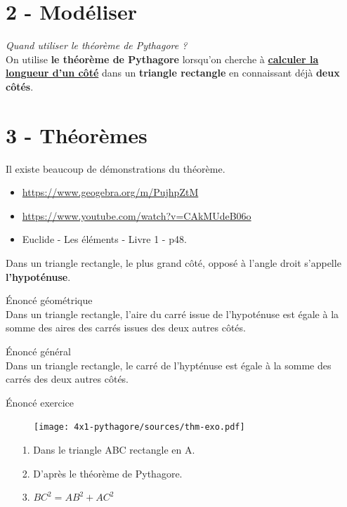 \documentclass[12pt]{article}
\begin{document}
\newpage
\section*{2 - Modéliser}

\textit{Quand utiliser le théorème de Pythagore ?}\\

On utilise \textbf{le théorème de Pythagore} lorsqu'on cherche à \underline{\textbf{calculer la longueur d'un côté}} dans un \textbf{triangle rectangle} en connaissant déjà \textbf{deux côtés}.



\section*{3 - Théorèmes}

Il existe beaucoup de démonstrations du théorème.

\begin{itemize}
	\item \url{https://www.geogebra.org/m/PujhpZtM}
	\item \url{https://www.youtube.com/watch?v=CAkMUdeB06o}
	\item Euclide - Les éléments - Livre 1 - p48.
\end{itemize}


\begin{Definition}
	Dans un triangle rectangle, le plus grand côté, opposé à l'angle droit s'appelle \textbf{l'hypoténuse}.
\end{Definition}



\begin{Theorem}{Énoncé géométrique}\\
	Dans un triangle rectangle, l'aire du carré issue de l'hypoténuse est égale à la somme des aires des carrés issues des deux autres côtés.
\end{Theorem}

\begin{Theorem}{Énoncé général}\\
	Dans un triangle rectangle, le carré de l'hypténuse est égale à la somme des carrés des deux autres côtés.
\end{Theorem}


\begin{Theorem}{Énoncé exercice}\\

	\begin{figure}[H]
		\centering
		\texttt{[image: 4x1-pythagore/sources/thm-exo.pdf]}
	\end{figure}
	
	\begin{enumerate}
		\item[1.] Dans le triangle ABC rectangle en A.
		\item[2.] D'après le théorème de Pythagore.
		\item[3.] $BC^2 = AB^2 + AC^2$
	\end{enumerate}
\end{Theorem}
\end{document}
